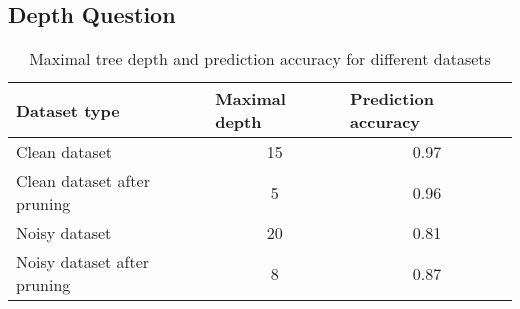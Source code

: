 \documentclass[11pt, a4paper]{article}
\begin{document}
\subsection{\textbf{Depth Question}}
  \begin{table}[h]
  \centering
  \begin{tabular}{|l|c|c|}
  \hline
  \textbf{Dataset type} & \multicolumn{1}{l|}{\textbf{Maximal depth}} & \multicolumn{1}{l|}{\textbf{Prediction accuracy}} \\ \hline
  Clean dataset               & 15 & 0.97 \\ \hline
  Clean dataset after pruning & 5  & 0.96 \\ \hline
  Noisy dataset               & 20 & 0.81 \\ \hline
  Noisy dataset after pruning & 8  & 0.87 \\ \hline
  \end{tabular}
  \caption{Maximal tree depth and prediction accuracy for different datasets}
  \label{t6}
  \end{table}
\end{document}
